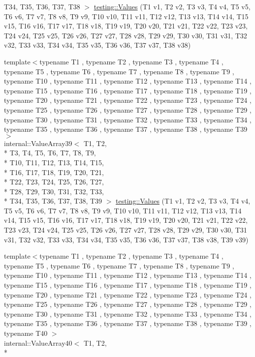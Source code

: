 \begin{DoxyCompactItemize}
T34, T35, T36, T37, T38 $>$ \hyperlink{namespacetesting_aabc33ee31d17eb0b0bed3401d62266d9}{testing\-::\-Values} (T1 v1, T2 v2, T3 v3, T4 v4, T5 v5, T6 v6, T7 v7, T8 v8, T9 v9, T10 v10, T11 v11, T12 v12, T13 v13, T14 v14, T15 v15, T16 v16, T17 v17, T18 v18, T19 v19, T20 v20, T21 v21, T22 v22, T23 v23, T24 v24, T25 v25, T26 v26, T27 v27, T28 v28, T29 v29, T30 v30, T31 v31, T32 v32, T33 v33, T34 v34, T35 v35, T36 v36, T37 v37, T38 v38)
\item 
{\footnotesize template$<$typename T1 , typename T2 , typename T3 , typename T4 , typename T5 , typename T6 , typename T7 , typename T8 , typename T9 , typename T10 , typename T11 , typename T12 , typename T13 , typename T14 , typename T15 , typename T16 , typename T17 , typename T18 , typename T19 , typename T20 , typename T21 , typename T22 , typename T23 , typename T24 , typename T25 , typename T26 , typename T27 , typename T28 , typename T29 , typename T30 , typename T31 , typename T32 , typename T33 , typename T34 , typename T35 , typename T36 , typename T37 , typename T38 , typename T39 $>$ }\\internal\-::\-Value\-Array39$<$ T1, T2, \\*
T3, T4, T5, T6, T7, T8, T9, \\*
T10, T11, T12, T13, T14, T15, \\*
T16, T17, T18, T19, T20, T21, \\*
T22, T23, T24, T25, T26, T27, \\*
T28, T29, T30, T31, T32, T33, \\*
T34, T35, T36, T37, T38, T39 $>$ \hyperlink{namespacetesting_aba3a6a2dcb9660c6ccb1d867c7a137ee}{testing\-::\-Values} (T1 v1, T2 v2, T3 v3, T4 v4, T5 v5, T6 v6, T7 v7, T8 v8, T9 v9, T10 v10, T11 v11, T12 v12, T13 v13, T14 v14, T15 v15, T16 v16, T17 v17, T18 v18, T19 v19, T20 v20, T21 v21, T22 v22, T23 v23, T24 v24, T25 v25, T26 v26, T27 v27, T28 v28, T29 v29, T30 v30, T31 v31, T32 v32, T33 v33, T34 v34, T35 v35, T36 v36, T37 v37, T38 v38, T39 v39)
\item 
{\footnotesize template$<$typename T1 , typename T2 , typename T3 , typename T4 , typename T5 , typename T6 , typename T7 , typename T8 , typename T9 , typename T10 , typename T11 , typename T12 , typename T13 , typename T14 , typename T15 , typename T16 , typename T17 , typename T18 , typename T19 , typename T20 , typename T21 , typename T22 , typename T23 , typename T24 , typename T25 , typename T26 , typename T27 , typename T28 , typename T29 , typename T30 , typename T31 , typename T32 , typename T33 , typename T34 , typename T35 , typename T36 , typename T37 , typename T38 , typename T39 , typename T40 $>$ }\\internal\-::\-Value\-Array40$<$ T1, T2, \\*

\end{DoxyCompactItemize}
